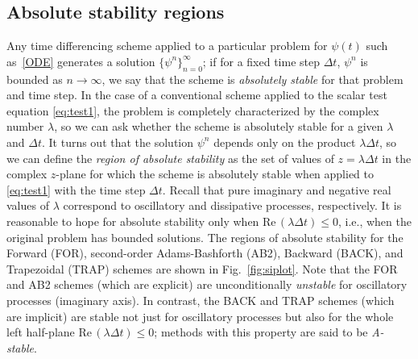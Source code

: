 \documentclass[12pt]{article}
\newcommand{\dt}{\Delta t}
\renewcommand{\Re}{\mbox{Re}\,}
\begin{document}
\pagebreak[3]
\subsection{Absolute stability regions}

Any time differencing scheme applied to a particular problem for $\psi(t)$
such as~\eqref{ODE} generates a solution $\{\psi^n\}_{n=0}^\infty$; if for a
fixed time step $\dt$, $\psi^n$ is bounded as $n\to\infty$, we say that
the scheme is \emph{absolutely stable} for that problem and time step.  In the
case of a conventional scheme applied to the scalar test equation
\eqref{eq:test1}, the problem is completely characterized by the complex
number $\lambda$, so we can ask whether the scheme is absolutely
stable for a given $\lambda$ and $\dt$.  It turns out that the solution
$\psi^n$ depends only on the product $\lambda\dt$, so we can define the
\emph{region of absolute stability} as the set of values of $z=\lambda\dt$ in
the complex $z$-plane for which the scheme is absolutely stable when applied
to \eqref{eq:test1} with the time step $\dt$.  Recall that pure imaginary
and negative real values of $\lambda$ correspond to oscillatory and
dissipative processes, respectively.  It is reasonable to hope for absolute
stability only when $\Re(\lambda\dt)\le0$, i.e., when the original problem
has bounded solutions.  The regions of absolute stability
for the Forward (FOR), second-order Adams-Bashforth (AB2), Backward (BACK),
and Trapezoidal (TRAP) schemes are shown in Fig.~\ref{fig:siplot}.  Note that
the FOR and AB2 schemes (which are explicit) are unconditionally
\emph{unstable} for oscillatory processes (imaginary axis).  In contrast, the
BACK and TRAP schemes (which are implicit) are stable not just for oscillatory
processes but also for the whole left half-plane $\Re(\lambda\dt)\le0$;
methods with this property are said to be \emph{A-stable}.

\end{document}
